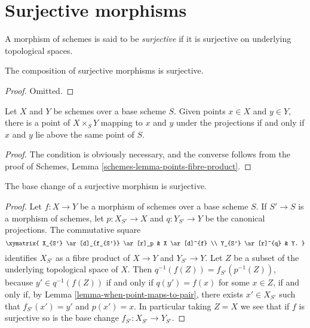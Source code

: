 \section{Surjective morphisms}
\label{section-surjective}

\begin{definition}
\label{definition-surjective}
A morphism of schemes is said to be {\it surjective}
if it is surjective on underlying topological
spaces.
\end{definition}

\begin{lemma}
\label{lemma-composition-surjective}
The composition of surjective morphisms is surjective.
\end{lemma}

\begin{proof}
Omitted.
\end{proof}

\begin{lemma}
\label{lemma-when-point-maps-to-pair}
Let $X$ and $Y$ be schemes over a base scheme $S$. Given points $x \in X$ and
$y \in Y$, there is a point of $X \times_S Y$ mapping to $x$ and $y$ under the
projections if and only if $x$ and $y$ lie above the same point of $S$.
\end{lemma}

\begin{proof}
The condition is obviously necessary, and the converse follows from the proof
of Schemes, Lemma \ref{schemes-lemma-points-fibre-product}.
\end{proof}

\begin{lemma}
\label{lemma-base-change-surjective}
The base change of a surjective morphism is surjective.
\end{lemma}

\begin{proof}
Let $f: X \to Y$ be a morphism of schemes over a base scheme $S$.
If $S' \to S$ is a morphism of schemes, let $p: X_{S'} \to X$
and $q: Y_{S'} \to Y$ be the canonical projections.  The commutative
square
$$
\xymatrix{
X_{S'} \ar[d]_{f_{S'}} \ar[r]_p & X \ar[d]^{f} \\
Y_{S'} \ar[r]^{q} & Y.
}
$$
identifies $X_{S'}$ as a fibre product of $X \to Y$ and
$Y_{S'} \to Y$.  Let $Z$ be a subset of the underlying topological
space of $X$.  Then $q^{-1}(f(Z)) = f_{S'}(p^{-1}(Z))$, because
$y' \in q^{-1}(f(Z))$ if and only if $q(y') = f(x)$ for some $x \in Z$,
if and only if, by Lemma \ref{lemma-when-point-maps-to-pair}, there exists
$x' \in X_{S'}$ such that $f_{S'}(x') = y'$ and $p(x') = x$.  In particular
taking $Z = X$ we see that if $f$ is surjective so is the base change
$f_{S'}: X_{S'} \to Y_{S'}$.
\end{proof}

